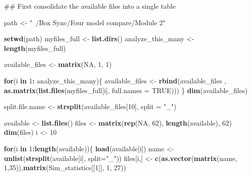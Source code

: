 \documentclass[]{book}
\newenvironment{Shaded}{\begin{snugshade}}{\end{snugshade}}
\newcommand{\KeywordTok}[1]{\textcolor[rgb]{0.13,0.29,0.53}{\textbf{{#1}}}}
\newcommand{\DataTypeTok}[1]{\textcolor[rgb]{0.13,0.29,0.53}{{#1}}}
\newcommand{\DecValTok}[1]{\textcolor[rgb]{0.00,0.00,0.81}{{#1}}}
\newcommand{\StringTok}[1]{\textcolor[rgb]{0.31,0.60,0.02}{{#1}}}
\newcommand{\OtherTok}[1]{\textcolor[rgb]{0.56,0.35,0.01}{{#1}}}
\newcommand{\ControlFlowTok}[1]{\textcolor[rgb]{0.13,0.29,0.53}{\textbf{{#1}}}}
\newcommand{\OperatorTok}[1]{\textcolor[rgb]{0.81,0.36,0.00}{\textbf{{#1}}}}
\newcommand{\NormalTok}[1]{{#1}}
\theoremstyle{definition}
\theoremstyle{definition}
\theoremstyle{remark}
\begin{document}
\begin{Shaded}
\begin{Highlighting}[]
\NormalTok{## First consolidate the available files into a single table}
    
\NormalTok{      path <-}\StringTok{ "~/Box Sync/Four model compare/Module 2"}
           
     
           \KeywordTok{setwd}\NormalTok{(path)}
\NormalTok{    myfiles_full <-}\StringTok{ }\KeywordTok{list.dirs}\NormalTok{()}
\NormalTok{    analyze_this_many <-}\StringTok{ }\KeywordTok{length}\NormalTok{(myfiles_full)}
    
\NormalTok{    available_files <-}\StringTok{ }\KeywordTok{matrix}\NormalTok{(}\OtherTok{NA}\NormalTok{, }\DecValTok{1}\NormalTok{, }\DecValTok{1}\NormalTok{)}
    
        
    \ControlFlowTok{for}\NormalTok{(i }\ControlFlowTok{in} \DecValTok{1}\OperatorTok{:}\StringTok{ }\NormalTok{analyze_this_many)\{}
\NormalTok{    available_files <-}\StringTok{ }\KeywordTok{rbind}\NormalTok{(available_files , }\KeywordTok{as.matrix}\NormalTok{(}\KeywordTok{list.files}\NormalTok{(myfiles_full[i], }\DataTypeTok{full.names =} \OtherTok{TRUE}\NormalTok{)))}
\NormalTok{    \}}
    \KeywordTok{dim}\NormalTok{(available_files)}
    
\NormalTok{    split.file.name <-}\StringTok{ }\KeywordTok{strsplit}\NormalTok{(available_files[}\DecValTok{10}\NormalTok{], }\DataTypeTok{split =} \StringTok{"_"}\NormalTok{) }
    
    
    
 
\NormalTok{available <-}\StringTok{ }\KeywordTok{list.files}\NormalTok{()}
\NormalTok{files <-}\StringTok{ }\KeywordTok{matrix}\NormalTok{(}\KeywordTok{rep}\NormalTok{(}\OtherTok{NA}\NormalTok{, }\DecValTok{62}\NormalTok{), }\KeywordTok{length}\NormalTok{(available), }\DecValTok{62}\NormalTok{)}
\KeywordTok{dim}\NormalTok{(files)}
\NormalTok{i <-}\StringTok{ }\DecValTok{10}


\ControlFlowTok{for}\NormalTok{(i }\ControlFlowTok{in} \DecValTok{1}\OperatorTok{:}\KeywordTok{length}\NormalTok{(available))\{}
\KeywordTok{load}\NormalTok{(available[i])}
\NormalTok{name <-}\StringTok{ }\KeywordTok{unlist}\NormalTok{(}\KeywordTok{strsplit}\NormalTok{(available[i], }\DataTypeTok{split=}\StringTok{"_"}\NormalTok{))}
\NormalTok{files[i,] <-}\StringTok{ }\KeywordTok{c}\NormalTok{(}\KeywordTok{as.vector}\NormalTok{(}\KeywordTok{matrix}\NormalTok{(name, }\DecValTok{1}\NormalTok{,}\DecValTok{35}\NormalTok{)),}\KeywordTok{matrix}\NormalTok{(Sim_statistics[[}\DecValTok{1}\NormalTok{]], }\DecValTok{1}\NormalTok{, }\DecValTok{27}\NormalTok{))}


\end{Highlighting}
\end{Shaded}
\end{document}
